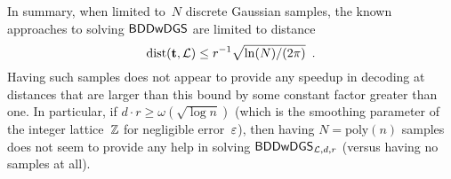 \documentclass{iacrcc}
\begin{document}
In summary, when limited to~$N$ discrete Gaussian samples, the known
approaches to solving $\mathsf{BDDwDGS}$ are limited to distance
\begin{equation}
  \label{eq:dist-given-samples}
  \operatorname{dist}(\mathbf{t}, \mathcal{L}) \leq r^{-1} \sqrt{\ln(N)/(2\pi)} \enspace .
\end{equation}
Having such samples does not appear to provide any speedup in
decoding at distances that are larger than this bound by some constant factor
greater than one.  In particular, if
$d \cdot r \geq \omega(\sqrt{\log n})$ (which is the smoothing
parameter of the integer lattice~$\mathbb{Z}$ for negligible error~$\varepsilon$),
then having $N=\text{poly}(n)$ samples does not seem to provide any
help in solving $\mathsf{BDDwDGS}_{\mathcal{L},d,r}$ (versus having no samples at
all).




\end{document}
